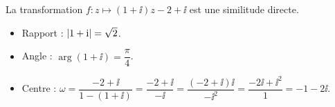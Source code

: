 \begin{exemple}
	La transformation $f : z \mapsto (1 + \ii)z - 2 + \ii$ est une similitude directe.
	\begin{itemize}[label=\textbullet]
		\item Rapport : $\left|1 + \mathrm{i}\right| = \sqrt{2}$.
		\item Angle : $\arg(1 + \ii) = \dfrac{\pi}{4}$.
		\item Centre : $\omega = \dfrac{-2 + \ii}{1 - (1 + \ii)} = \dfrac{-2 + \ii}{-\ii}
		= \dfrac{(-2 + \ii)\ii}{-\ii^2} = \dfrac{-2\ii + \ii^2}{1} = -1 - 2\ii$.
	\end{itemize}
\end{exemple}


